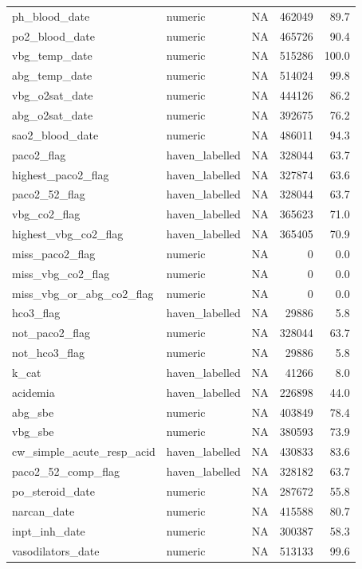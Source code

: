 \documentclass[
  11pt,
  letterpaper,
  DIV=11,
  numbers=noendperiod]{scrartcl}
\begin{document}
\begin{longtable*}{llrrr}
ph\_blood\_date & numeric & NA & 462049 & 89.7\\
po2\_blood\_date & numeric & NA & 465726 & 90.4\\
\addlinespace
vbg\_temp\_date & numeric & NA & 515286 & 100.0\\
abg\_temp\_date & numeric & NA & 514024 & 99.8\\
vbg\_o2sat\_date & numeric & NA & 444126 & 86.2\\
abg\_o2sat\_date & numeric & NA & 392675 & 76.2\\
sao2\_blood\_date & numeric & NA & 486011 & 94.3\\
\addlinespace
paco2\_flag & haven\_labelled & NA & 328044 & 63.7\\
highest\_paco2\_flag & haven\_labelled & NA & 327874 & 63.6\\
paco2\_52\_flag & haven\_labelled & NA & 328044 & 63.7\\
vbg\_co2\_flag & haven\_labelled & NA & 365623 & 71.0\\
highest\_vbg\_co2\_flag & haven\_labelled & NA & 365405 & 70.9\\
\addlinespace
miss\_paco2\_flag & numeric & NA & 0 & 0.0\\
miss\_vbg\_co2\_flag & numeric & NA & 0 & 0.0\\
miss\_vbg\_or\_abg\_co2\_flag & numeric & NA & 0 & 0.0\\
hco3\_flag & haven\_labelled & NA & 29886 & 5.8\\
not\_paco2\_flag & numeric & NA & 328044 & 63.7\\
\addlinespace
not\_hco3\_flag & numeric & NA & 29886 & 5.8\\
k\_cat & haven\_labelled & NA & 41266 & 8.0\\
acidemia & haven\_labelled & NA & 226898 & 44.0\\
abg\_sbe & numeric & NA & 403849 & 78.4\\
vbg\_sbe & numeric & NA & 380593 & 73.9\\
\addlinespace
cw\_simple\_acute\_resp\_acid & haven\_labelled & NA & 430833 & 83.6\\
paco2\_52\_comp\_flag & haven\_labelled & NA & 328182 & 63.7\\
po\_steroid\_date & numeric & NA & 287672 & 55.8\\
narcan\_date & numeric & NA & 415588 & 80.7\\
inpt\_inh\_date & numeric & NA & 300387 & 58.3\\
\addlinespace
vasodilators\_date & numeric & NA & 513133 & 99.6\\

\end{longtable*}
\end{document}
